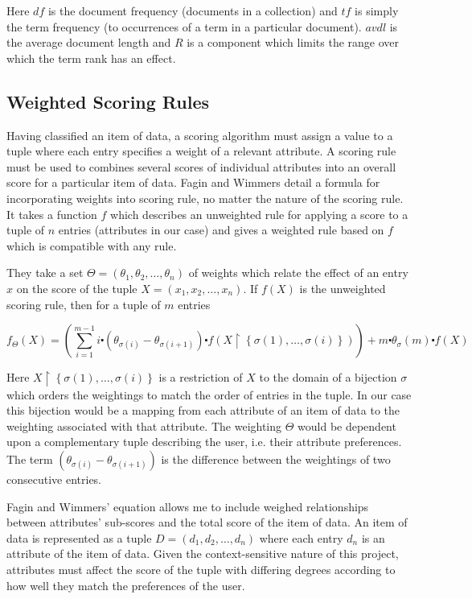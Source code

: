 Here $df$ is the document frequency (documents in a collection) and $tf$ is simply the term frequency (to occurrences of a term in a particular document). $avdl$ is the average document length and $R$ is a component which limits the range over which the term rank has an effect. 

\subsection{Weighted Scoring Rules}

Having classified an item of data, a scoring algorithm must assign a value to a tuple where each entry specifies a weight of a relevant attribute. A scoring rule must be used to combines several scores of individual attributes into an overall score for a particular item of data. 
Fagin and Wimmers \cite{FaginWimmers1} detail a formula for incorporating weights into scoring rule, no matter the nature of the scoring rule. It takes a function $f$ which describes an unweighted rule for applying a score to a tuple of $n$ entries (attributes in our case) and gives a weighted rule based on $f$ which is compatible with any rule. 

They take a set $\Theta = (\theta_1,\theta_2,\dotsc,\theta_n)$ of weights which relate the effect of an entry $x$ on the score of the tuple $ X = (x_1, x_2, \dots, x_n)$. If $f(X)$ is the unweighted scoring rule, then for a tuple of $m$ entries

\begin{equation}\label{WeightedRule}	
	f_\Theta (X) = \left(\sum_{i=1}^{m-1} i\centerdot (\theta_{\sigma{(i)}} - \theta_{\sigma{(i+1)}})\centerdot f(X\upharpoonright\left\{\sigma(1),\dots,\sigma(i)\right\})\right) + m \centerdot \theta_\sigma{(m)} \centerdot f(X)
\end{equation}

Here $X\upharpoonright\left\{\sigma(1),\dots,\sigma(i)\right\}$ is a restriction of $X$ to the domain of a bijection $\sigma$ which orders the weightings to match the order of entries in the tuple. In our case this bijection would be a mapping from each attribute of an item of data to the weighting associated with that attribute. The weighting $\Theta$ would be dependent upon a complementary tuple describing the user, i.e. their attribute preferences. The term $(\theta_{\sigma{(i)}} - \theta_{\sigma{(i+1)}})$ is the difference between the weightings of two consecutive entries. 

Fagin and Wimmers' equation allows me to include weighed relationships between attributes' sub-scores and the total score of the item of data. An item of data is represented as a tuple $ D = (d_1, d_2, \dots, d_n)$ where each entry $d_n$ is an attribute of the item of data. Given the context-sensitive nature of this project, attributes must affect the score of the tuple with differing degrees according to how well they match the preferences of the user. 

